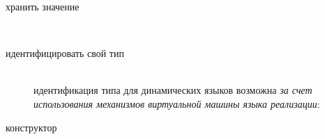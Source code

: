\secdown


\begin{description}
\item[хранить значение]\ \\
\noindent{}
\item[идентифицировать свой тип]\ \\
идентификация типа для динамических языков возможна \emph{за счет использования
механизмов виртуальной машины языка реализации}:
\noindent{}
\item[конструктор]\ \\
\noindent{}
\end{description}

\secup